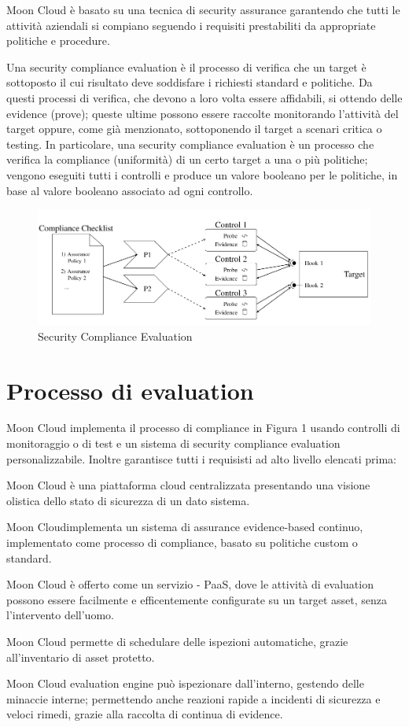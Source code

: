 Moon Cloud è basato su una tecnica di security assurance garantendo che tutti le attività aziendali si compiano
seguendo i requisiti prestabiliti da appropriate politiche e procedure.

Una security compliance evaluation è il processo di verifica che un target è sottoposto il cui risultato deve 
soddisfare i richiesti standard e politiche. Da questi processi di verifica, che devono a loro volta essere 
affidabili, si ottendo delle evidence (prove); queste ultime possono essere raccolte monitorando l'attività
del target oppure, come già menzionato, sottoponendo il target a scenari
critica o testing.
In particolare, una security compliance evaluation è un processo che verifica la compliance (uniformità)
di un certo target a una o più politiche; vengono eseguiti tutti i controlli e produce un valore booleano per
le politiche, in base al valore booleano associato ad ogni controllo.
\begin{figure}
	\includegraphics[scale=0.5]{images/Security_Compliance_Evaluation.PNG}
	\caption{Security Compliance Evaluation}
\end{figure}


\section{Processo di evaluation}
Moon Cloud implementa il processo di compliance in Figura 1 usando controlli di monitoraggio o di test e un sistema
di security compliance evaluation personalizzabile. Inoltre garantisce tutti i requisisti ad alto livello 
elencati prima:
\begin{description}
	\item Moon Cloud è una piattaforma cloud centralizzata presentando una visione olistica dello stato di 
	sicurezza di un dato sistema.
	\item Moon Cloudimplementa un sistema di assurance evidence-based continuo, implementato come processo di compliance,
	basato su politiche custom o standard.
	\item Moon Cloud è offerto come un servizio - PaaS, dove le attività di evaluation possono essere facilmente 
	e efficentemente configurate su un target asset, senza l'intervento dell'uomo.
	\item Moon Cloud permette di schedulare delle ispezioni automatiche, grazie all'inventario di asset protetto.
	\item Moon Cloud evaluation engine può ispezionare dall'interno, gestendo delle minaccie interne; permettendo 
	anche reazioni rapide a incidenti di sicurezza e veloci rimedi, grazie alla raccolta di continua di evidence. 
\end{description}


